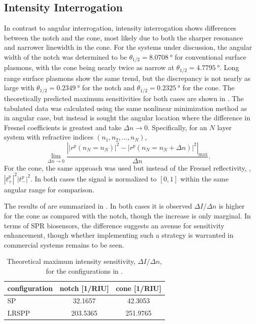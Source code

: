 \subsection{Intensity Interrogation}

In contrast to angular interrogation, intensity interrogation shows
differences between the notch and the cone, most likely due to both the
sharper resonance and narrower linewidth in the cone.  For the systems under
discussion, the angular width of the notch was determined to be
$\theta_{1/2}=\SI{8.0708}{\degree}$ for conventional surface plasmons, with
the cone being nearly twice as narrow at $\theta_{1/2}=\SI{4.7795}{\degree}$.
Long range surface plasmons show the same trend, but the discrepancy is not
nearly as large with $\theta_{1/2}=\SI{0.2349}{\degree}$ for the notch and
$\theta_{1/2}=\SI{0.2325}{\degree}$ for the cone.  The theoretically predicted
maximum sensitivities for both cases are shown in .
The tabulated data was calculated using the same nonlinear minimization method
as in angular case, but instead is sought the angular location where the
difference in Fresnel coefficients is greatest and take $\Delta n \to 0$.
Specifically, for an $N$ layer system with refractive indices $(n_1,n_2,
\ldots,n_N)$,
\begin{equation}
\lim_{\Delta n \to 0}\frac{\left||r^p(n_N=n_N)|^2 - |r^p(n_N=n_N + \Delta
				n)|^2\right|_\mathrm{max}}{\Delta n}.
\label{eqn:fresnelsenspertrubation}
\end{equation}
For the cone, the same approach was used but instead of the Fresnel
reflectivity, , $|t^p_+|^2|t^p_-|^2$.  In
both cases the signal is normalized to $[0,1]$ within the same angular range
for comparison.

The results of are summarized in
.  In both cases it is observed $\Delta I/\Delta
n$ is higher for the cone as compared with the notch, though the increase
is only marginal.  In terms of SPR biosensors, the difference suggests an
avenue for sensitivity enhancement, though whether implementing such a
strategy is warranted in commercial systems remains to be seen.
\begin{table}[ht]
\centering
{}
\begin{tabular}{lSS}
\toprule
{configuration} & {notch [1/RIU]} & {cone [1/RIU]} \\
\midrule
SP & 32.1657 & 42.3053 \\
LRSPP & 203.5365 & 251.9765 \\
\bottomrule
\end{tabular}
\caption{Theoretical maximum intensity sensitivity, $\Delta I/\Delta n$,
								for the configurations in . }
\label{tbl:intensitysens}
\end{table}

